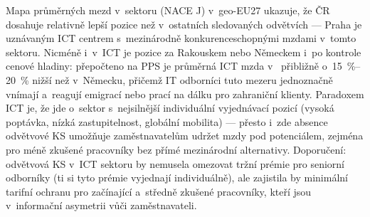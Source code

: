Mapa průměrných mezd v~sektoru  (\ac{NACE} J) v~\acs{geo-EU27} ukazuje, že ČR dosahuje relativně lepší pozice než v~ostatních sledovaných odvětvích --- Praha je uznávaným ICT centrem s~mezinárodně konkurenceschopnými mzdami v~tomto sektoru.
Nicméně i~v~ICT je pozice  za Rakouskem nebo Německem i~po kontrole cenové hladiny: přepočteno na \ac{PPS} je průměrná ICT mzda v~ přibližně o~\SIrange{15}{20}{\percent} nižší než v~Německu, přičemž IT odborníci tuto mezeru jednoznačně vnímají a~reagují emigrací nebo prací na dálku pro zahraniční klienty.
Paradoxem ICT je, že jde o~sektor s~nejsilnější individuální vyjednávací pozicí (vysoká poptávka, nízká zastupitelnost, globální mobilita) --- přesto i~zde absence odvětvové \ac{KS} umožňuje zaměstnavatelům udržet mzdy pod potenciálem, zejména pro méně zkušené pracovníky bez přímé mezinárodní alternativy.
Doporučení: odvětvová \ac{KS} v~ICT sektoru by nemusela omezovat tržní prémie pro seniorní odborníky (ti si tyto prémie vyjednají individuálně), ale zajistila by minimální tarifní ochranu pro začínající a~středně zkušené pracovníky, kteří jsou v~informační asymetrii vůči zaměstnavateli.


